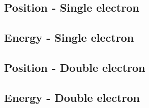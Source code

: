 \subsection{Position - Single electron}
\subsection{Energy - Single electron}
\subsection{Position - Double electron}
\subsection{Energy - Double electron}
